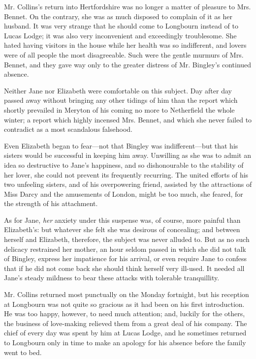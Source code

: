 \documentclass[12pt]{book}
\begin{document}
Mr. Collins's return into Hertfordshire was no longer a matter of pleasure to Mrs. Bennet. On the contrary, she was as much disposed to complain of it as her husband. It was very strange that he should come to Longbourn instead of to Lucas Lodge; it was also very inconvenient and exceedingly troublesome. She hated having visitors in the house while her health was so indifferent, and lovers were of all people the most disagreeable. Such were the gentle murmurs of Mrs. Bennet, and they gave way only to the greater distress of Mr. Bingley's continued absence.

Neither Jane nor Elizabeth were comfortable on this subject. Day after day passed away without bringing any other tidings of him than the report which shortly prevailed in Meryton of his coming no more to Netherfield the whole winter; a report which highly incensed Mrs. Bennet, and which she never failed to contradict as a most scandalous falsehood.

Even Elizabeth began to fear---not that Bingley was indifferent---but that his sisters would be successful in keeping him away. Unwilling as she was to admit an idea so destructive to Jane's happiness, and so dishonourable to the stability of her lover, she could not prevent its frequently recurring. The united efforts of his two unfeeling sisters, and of his overpowering friend, assisted by the attractions of Miss Darcy and the amusements of London, might be too much, she feared, for the strength of his attachment.

As for Jane, \textit{her} anxiety under this suspense was, of course, more painful than Elizabeth's: but whatever she felt she was desirous of concealing; and between herself and Elizabeth, therefore, the subject was never alluded to. But as no such delicacy restrained her mother, an hour seldom passed in which she did not talk of Bingley, express her impatience for his arrival, or even require Jane to confess that if he did not come back she should think herself very ill-used. It needed all Jane's steady mildness to bear these attacks with tolerable tranquillity.

Mr. Collins returned most punctually on the Monday fortnight, but his reception at Longbourn was not quite so gracious as it had been on his first introduction. He was too happy, however, to need much attention; and, luckily for the others, the business of love-making relieved them from a great deal of his company. The chief of every day was spent by him at Lucas Lodge, and he sometimes returned to Longbourn only in time to make an apology for his absence before the family went to bed.
\end{document}

